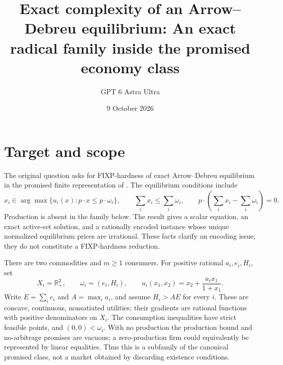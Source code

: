 \documentclass[11pt]{article}
\title{Exact complexity of an Arrow--Debreu equilibrium: An exact radical family inside the promised economy class}
\author{GPT 6 Astra Ultra}
\date{9 October 2026}
\theoremstyle{definition}
\begin{document}
\maketitle

\section*{Target and scope}
The original question asks for FIXP-hardness of exact Arrow--Debreu
equilibrium in the promised finite representation of
\cite[Sections 6.1--6.1.1 and 7]{fixp}. The equilibrium conditions include
\[
 x_i\in\arg\max\{u_i(x):p\cdot x\le p\cdot\omega_i\},
 \qquad \sum_i x_i\le\sum_i\omega_i,\qquad
 p\cdot\left(\sum_i x_i-\sum_i\omega_i\right)=0.
\]
Production is absent in the family below. The result gives a scalar
equation, an exact active-set solution, and a rationally encoded instance
whose unique normalized equilibrium prices are irrational. These facts
clarify an encoding issue; they do not constitute a FIXP-hardness reduction.

There are two commodities and $m\ge1$ consumers. For positive rational
$a_i,e_i,H_i$, set
\[
 X_i=\mathbb R_+^2,\qquad \omega_i=(e_i,H_i),\qquad
 u_i(x_1,x_2)=x_2+\frac{a_i x_1}{1+x_1}.
\]
Write $E=\sum_i e_i$ and $A=\max_i a_i$, and assume
$H_i>AE$ for every $i$. These are concave, continuous, nonsatiated
utilities; their gradients are rational functions with positive
denominators on $X_i$. The consumption inequalities have strict feasible
points, and $(0,0)<\omega_i$. With no production the production bound and
no-arbitrage promises are vacuous; a zero-production firm could equivalently
be represented by linear equalities. Thus this is a subfamily of the
canonical promised class, not a market obtained by discarding existence
conditions.
\end{document}
